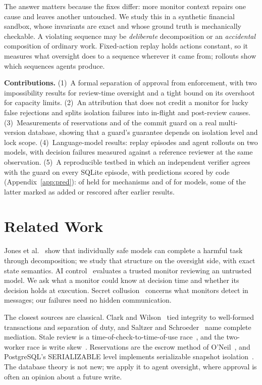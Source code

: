 \documentclass[10pt]{article}
\begin{document}
The answer matters because the fixes differ: more monitor context repairs one cause and leaves another untouched. We study this in a synthetic financial sandbox, whose invariants are exact and whose ground truth is mechanically checkable. A violating sequence may be \emph{deliberate} decomposition or an \emph{accidental} composition of ordinary work. Fixed-action replay holds actions constant, so it measures what oversight does to a sequence wherever it came from; rollouts show which sequences agents produce.

\textbf{Contributions.} (1)~A formal separation of approval from enforcement, with two impossibility results for review-time oversight and a tight bound on its overshoot for capacity limits. (2)~An attribution that does not credit a monitor for lucky false rejections and splits isolation failures into in-flight and post-review causes. (3)~Measurements of reservations and of the commit guard on a real multi-version database, showing that a guard's guarantee depends on isolation level and lock scope. (4)~Language-model results: \nLlmFixedEpisodes{} replay episodes and \nLlmRollouts{} agent rollouts on two models, with decision failures measured against a reference reviewer at the same observation. (5)~A reproducible testbed in which an independent verifier agrees with the guard on every SQLite episode, with predictions scored by code (Appendix~\ref{app:pred}): \predHeld{} of \predTotal{} held for mechanisms and \predLlmHeld{} of \predLlmTotal{} for models, some of the latter marked as added or rescored after earlier results.

\section{Related Work}
Jones et al.~\cite{jones2024} show that individually safe models can complete a harmful task through decomposition; we study that structure on the oversight side, with exact state semantics. AI control~\cite{greenblatt2023} evaluates a trusted monitor reviewing an untrusted model. We ask what a monitor could know at decision time and whether its decision holds at execution. Secret collusion~\cite{motwani2024} concerns what monitors detect in messages; our failures need no hidden communication.

The closest sources are classical. Clark and Wilson~\cite{clark1987} tied integrity to well-formed transactions and separation of duty, and Saltzer and Schroeder~\cite{saltzer1975} name complete mediation. Stale review is a time-of-check-to-time-of-use race~\cite{bishop1996}, and the two-worker race is write skew~\cite{berenson1995,fekete2005}. Reservations are the escrow method of O'Neil~\cite{oneil1986}, and PostgreSQL's SERIALIZABLE level implements serializable snapshot isolation~\cite{ports2012}. The database theory is not new; we apply it to agent oversight, where approval is often an opinion about a future write.
\end{document}
